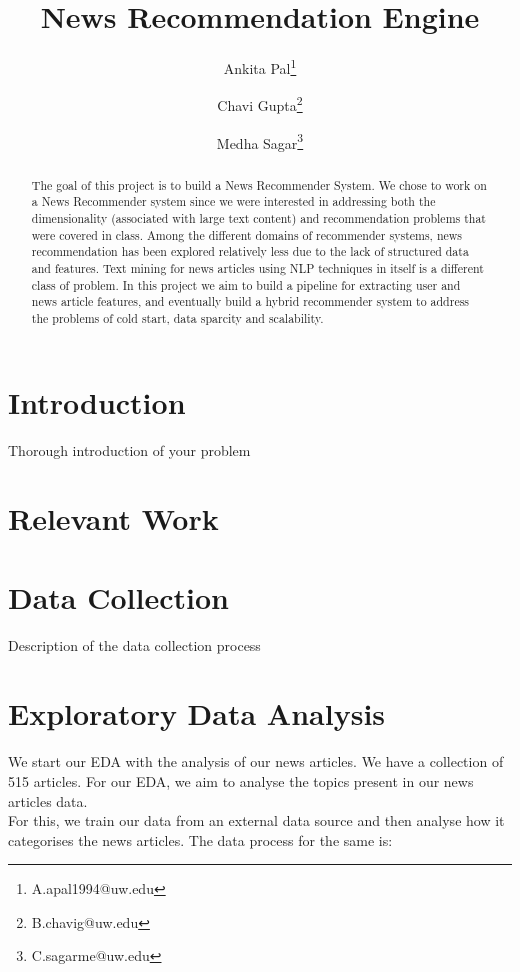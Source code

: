 \documentclass{article}
\title{News Recommendation Engine}
\author[1]{Ankita Pal\thanks{A.apal1994@uw.edu}}
\author[1]{Chavi Gupta\thanks{B.chavig@uw.edu}}
\author[1]{Medha Sagar\thanks{C.sagarme@uw.edu}}
\affil[1]{Department of Data Science, University of Washington}
\begin{document}
\maketitle

\begin{abstract}
    The goal of this project is to build a News Recommender System. We chose to work on a News Recommender system since we were interested in addressing both the dimensionality (associated with large text content) and recommendation problems that were covered in class. Among the different domains of recommender systems, news recommendation has been explored relatively less due to the lack of structured data and features. Text mining for news articles using NLP techniques in itself is a different class of problem. In this project we aim to build a pipeline for extracting user and news article features, and eventually build a hybrid recommender system to address the problems of cold start, data sparcity and scalability. 
\end{abstract}

\section{Introduction}

{Thorough introduction of your problem}

\section{Relevant Work}


\section{Data Collection}

{Description of the data collection process}

\section{Exploratory Data Analysis}

We start our EDA with the analysis of our news articles. We have a collection of 515 articles. For our EDA, we aim to analyse the topics present in our news articles data. \\
 For this, we train our data from an external data source and then analyse how it categorises the news articles. The data process for the same is: \\
\end{document}
